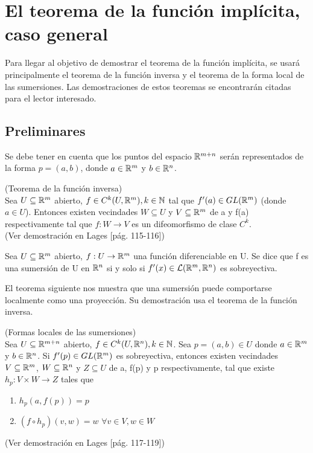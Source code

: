 \chapter{El teorema de la función implícita, caso general}

Para llegar al objetivo de demostrar el teorema de la función implícita, se usará principalmente el teorema de la función inversa y el teorema de la forma local de las sumersiones. Las demostraciones de estos teoremas se encontrarán citadas para el lector interesado.
\section{Preliminares}
Se debe tener en cuenta que los puntos del espacio ${\mathbb{R}}^{m+n}$ serán representados de la forma $p=(a,b)$, donde $a\in{\mathbb{R}}^m$ y $b\in{\mathbb{R}}^n$.
\begin{Teo}(Teorema de la función inversa)\\
Sea $U\subseteq{\mathbb{R}}^m $ abierto, $f\in C^k(U,{\mathbb{R}}^m), k\in{\mathbb{N}}$ tal que $f'(a)\in GL({\mathbb{R}}^m)$ (donde $a\in U$). Entonces existen vecindades $W\subseteq U$ y $V\subseteq{\mathbb{R}}^m$ de a y f(a) respectivamente tal que $f:W\rightarrow V$ es un difeomorfismo de clase $C^k$.\\
(\textnormal{Ver demostración en} Lages \cite{lagesflaco} [pág. 115-116])
\end{Teo}
\begin{Def}
Sea $U\subseteq{\mathbb{R}}^m $ abierto, $f:U\rightarrow{\mathbb{R}}^m$ una función diferenciable en U. Se dice que f es una sumersión de U en ${\mathbb{R}}^n$ si y solo si $f'(x)\in\mathcal{L}({\mathbb{R}}^m,{\mathbb{R}}^n)$ es sobreyectiva.
\end{Def}
El teorema siguiente nos muestra que una sumersión puede comportarse localmente como una proyección. Su demostración usa el teorema de la función inversa.
\begin{Teo}(Formas locales de las sumersiones)\\
\label{sumersiones}
Sea $U\subseteq{\mathbb{R}}^{m+n} $ abierto, $f\in C^k(U,{\mathbb{R}}^n), k\in{\mathbb{N}}$. Sea $p=(a,b)\in U$ donde $a\in{\mathbb{R}}^m$ y $b\in{\mathbb{R}}^n$. Si $f'(p)\in GL({\mathbb{R}}^m)$ es sobreyectiva, entonces  existen vecindades $V\subseteq {\mathbb{R}}^m$, $W\subseteq{\mathbb{R}}^{n}$ y $Z\subseteq U$  de a, f(p) y p  respectivamente, tal que existe $h_p:V\times W\rightarrow Z$ tales que
\begin{enumerate}
    \item $h_p(a,f(p))=p$
    \item $(f\circ h_p)(v,w)=w$ \textbf{           } $\forall v\in V, w\in W$
\end{enumerate}
(\textnormal{Ver demostración en} Lages \cite{lagesflaco} [pág. 117-119])
\end{Teo}
